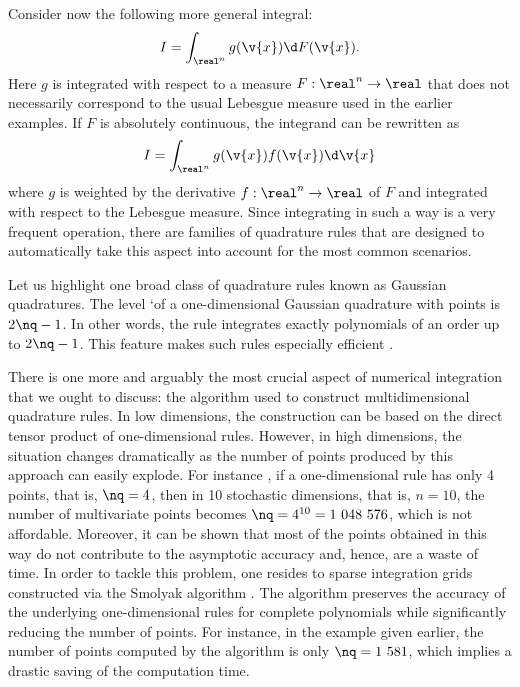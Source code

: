 Consider now the following more general integral:
\[
  I = \int_{\real^n} g(\v{x}) \d F(\v{x}).
\]
Here $g$ is integrated with respect to a measure $F: \real^n \to \real$
\cite{durrett2010} that does not necessarily correspond to the usual Lebesgue
measure used in the earlier examples. If $F$ is absolutely continuous, the
integrand can be rewritten as
\[
  I = \int_{\real^n} g(\v{x}) f(\v{x}) \d \v{x}
\]
where $g$ is weighted by the derivative $f: \real^n \to \real$ of $F$ and
integrated with respect to the Lebesgue measure. Since integrating in such a way
is a very frequent operation, there are families of quadrature rules that are
designed to automatically take this aspect into account for the most common
scenarios.

Let us highlight one broad class of quadrature rules known as Gaussian
quadratures. The level \lq of a one-dimensional Gaussian quadrature with \nq
points is $2 \nq - 1$. In other words, the rule integrates exactly polynomials
of an order up to $2 \nq - 1$. This feature makes such rules especially
efficient \cite{heiss2008}.

There is one more and arguably the most crucial aspect of numerical integration
that we ought to discuss: the algorithm used to construct multidimensional
quadrature rules. In low dimensions, the construction can be based on the direct
tensor product of one-dimensional rules. However, in high dimensions, the
situation changes dramatically as the number of points produced by this approach
can easily explode. For instance \cite{heiss2008}, if a one-dimensional rule has
only 4 points, that is, $\nq = 4$, then in 10 stochastic dimensions, that is, $n
= 10$, the number of multivariate points becomes $\nq = 4^{10} = 1~048~576$,
which is not affordable. Moreover, it can be shown that most of the points
obtained in this way do not contribute to the asymptotic accuracy and, hence,
are a waste of time. In order to tackle this problem, one resides to sparse
integration grids constructed via the Smolyak algorithm \cite{burkardt,
eldred2008, heiss2008}. The algorithm preserves the accuracy of the underlying
one-dimensional rules for complete polynomials while significantly reducing the
number of points. For instance, in the example given earlier, the number of
points computed by the algorithm is only $\nq = 1~581$, which implies a drastic
saving of the computation time.
